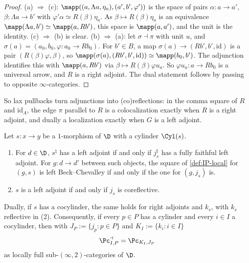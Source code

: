 \begin{proof}
(a) $\Rightarrow$ (c): $\mapp((a,\Lambda a,\eta_{a}),(a',b',\varphi'))$ is the space of pairs $\alpha\colon a \to a'$, $\beta\colon \Lambda a \to b'$ with $\varphi'\alpha \simeq R(\beta)\eta_{a}$. As $\beta \mapsto R(\beta)\eta_{a}$ is an equivalence $\mapp(\Lambda a,b') \simeq \mapp(a,Rb')$, this space is $\mapp(a,a')$, and the unit is the identity.
(c) $\Rightarrow$ (b) is clear.
(b) $\Rightarrow$ (a): let $\sigma \dashv \pi$ with unit $u$, and $\sigma(a) = (a_{0},b_{0},\varphi\colon a_{0} \to Rb_{0})$. For $b' \in B$, a map $\sigma(a) \to (Rb',b',\mathrm{id})$ is a pair $(R(\beta)\varphi,\beta)$, so $\mapp(\sigma(a),(Rb',b',\mathrm{id})) \simeq \mapp(b_{0},b')$. The adjunction identifies this with $\mapp(a,Rb')$ via $\beta \mapsto R(\beta)\varphi u_{a}$. So $\varphi u_{a}\colon a \to Rb_{0}$ is a universal arrow, and $R$ is a right adjoint.
The dual statement follows by passing to opposite $\infty$-categories.
\end{proof}

So lax pullbacks turn adjunctions into (co)reflections: in the comma square of $R$ and $\mathrm{id}_{A}$, the edge $\pi$ parallel to $R$ is a colocalization exactly when $R$ is a right adjoint, and dually a localization exactly when $G$ is a left adjoint.

\begin{prop}
\label{prop:cylinder}
Let $s\colon x \to y$ be a $1$-morphism of $\D$ with a cylinder $\Cyl(s)$.
\begin{enumerate}
\item For $d \in \D$, $s^{\natural}$ has a left adjoint if and only if $j_{s}^{\natural}$ has a fully faithful left adjoint. For $g\colon d \to d'$ between such objects, the square of \cref{def:IP-local} for $(g,s)$ is left Beck--Chevalley if and only if the one for $(g,j_{s})$ is.
\item $s$ is a left adjoint if and only if $j_{s}$ is coreflective.
\end{enumerate}
Dually, if $s$ has a cocylinder, the same holds for right adjoints and $k_{s}$, with $k_{s}$ reflective in (2).
Consequently, if every $p \in P$ has a cylinder and every $i \in I$ a cocylinder, then with $J_{P} := \{j_{p} : p \in P\}$ and $K_{I} := \{k_{i} : i \in I\}$
\[
\Pc^{\dashv}_{I,P} = \Pc_{K_{I},J_{P}}
\]
as locally full sub-$(\infty,2)$-categories of $\D$.
\end{prop}

